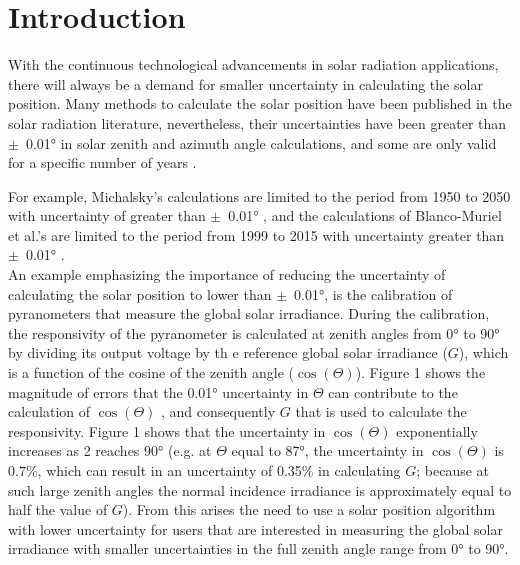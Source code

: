 \documentclass{article}
\begin{document}
\tableofcontents

\section{Introduction}

\par With the continuous technological advancements in solar radiation
applications, there will always be a demand for smaller uncertainty in
calculating the solar position. Many methods to calculate the solar
position have been published in the solar radiation literature,
nevertheless, their uncertainties have been greater than
$\pm$~\ang{0.01} in solar zenith and azimuth angle calculations, and
some are only valid for a specific number of years \cite{blanco}. \par
For example, Michalsky's calculations are limited to the period from
1950 to 2050 with uncertainty of greater than $\pm$~\ang{0.01}
\cite{michalsky}, and the calculations of Blanco-Muriel et al.'s are
limited to the period from 1999 to 2015 with uncertainty greater than
$\pm$~\ang{0.01} \cite{blanco}.\\ %

An example emphasizing the importance of reducing the uncertainty of
calculating the solar position to lower than $\pm$~\ang{0.01}, is the
calibration of pyranometers that measure the global solar
irradiance. During the calibration, the responsivity of the
pyranometer is calculated at zenith angles from \ang{0} to \ang{90} by
dividing its output voltage by th e reference global solar irradiance
($G$), which is a function of the cosine of the zenith angle
($\cos(\Theta)$). Figure 1 shows the magnitude of errors that the
\ang{0.01} uncertainty in $\Theta$ can contribute to the calculation of
$\cos(\Theta)$ , and consequently $G$ that is used to calculate the
responsivity.  Figure 1 shows that the uncertainty in $\cos(\Theta)$
exponentially increases as 2 reaches \ang{90} (e.g. at $\Theta$ equal to
\ang{87}, the uncertainty in $\cos(\Theta)$ is $0.7\%$, which can result in
an uncertainty of 0.35\% in calculating $G$; because at such large
zenith angles the normal incidence irradiance is approximately equal
to half the value of $G$). From this arises the need to use a solar
position algorithm with lower uncertainty for users that are
interested in measuring the global solar irradiance with smaller
uncertainties in the full zenith angle range from \ang{0} to
\ang{90}.\\ %
\end{document}
